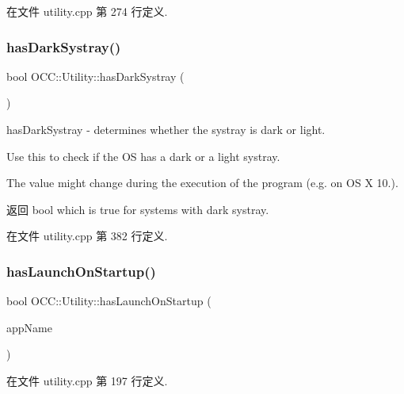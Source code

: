 在文件 utility.\+cpp 第 274 行定义.

\mbox{\label{namespace_o_c_c_1_1_utility_a56e1ad347247954a1cadec8c17ea412d}} 
\subsubsection{\texorpdfstring{has\+Dark\+Systray()}{hasDarkSystray()}}
{\footnotesize\ttfamily bool O\+C\+C\+::\+Utility\+::has\+Dark\+Systray (\begin{DoxyParamCaption}{ }\end{DoxyParamCaption})}



has\+Dark\+Systray -\/ determines whether the systray is dark or light. 

Use this to check if the OS has a dark or a light systray.

The value might change during the execution of the program (e.\+g. on OS X 10.).

\begin{DoxyReturn}{返回}
bool which is true for systems with dark systray. 
\end{DoxyReturn}


在文件 utility.\+cpp 第 382 行定义.

\mbox{\label{namespace_o_c_c_1_1_utility_a4db4f042cee5710dad04f70193992740}} 
\subsubsection{\texorpdfstring{has\+Launch\+On\+Startup()}{hasLaunchOnStartup()}}
{\footnotesize\ttfamily bool O\+C\+C\+::\+Utility\+::has\+Launch\+On\+Startup (\begin{DoxyParamCaption}\item[{const Q\+String \&}]{app\+Name }\end{DoxyParamCaption})}



在文件 utility.\+cpp 第 197 行定义.

